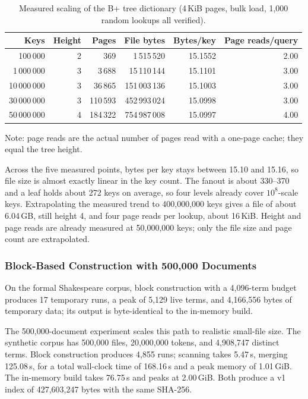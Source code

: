 \begin{table}[!htbp]
  \centering
  \caption{Measured scaling of the B+ tree dictionary (4\,KiB pages, bulk
  load, 1,000 random lookups all verified).}
  \label{tab:bptree-scale}
  \small
  \begin{tabular}{r r r r r r}
    \toprule
    Keys & Height & Pages & File bytes & Bytes/key & Page reads/query \\
    \midrule
    100\,000     & 2 & 369     & 1\,515\,520   & 15.1552 & 2.00 \\
    1\,000\,000   & 3 & 3\,688   & 15\,110\,144  & 15.1101 & 3.00 \\
    10\,000\,000  & 3 & 36\,865  & 151\,003\,136 & 15.1003 & 3.00 \\
    30\,000\,000  & 3 & 110\,593 & 452\,993\,024 & 15.0998 & 3.00 \\
    50\,000\,000  & 4 & 184\,322 & 754\,987\,008 & 15.0997 & 4.00 \\
    \bottomrule
  \end{tabular}
  \par\smallskip
  \footnotesize Note: page reads are the actual number of pages read with a
  one-page cache; they equal the tree height.
\end{table}



Across the five measured points, bytes per key stays between 15.10 and 15.16,
so file size is almost exactly linear in the key count. The fanout is about
330--370 and a leaf holds about 272 keys on average, so four levels already
cover $10^8$-scale keys. Extrapolating the measured trend to 400,000,000 keys
gives a file of about 6.04\,GB, still height 4, and four page reads per lookup,
about 16\,KiB. Height and page reads are already measured at 50,000,000 keys;
only the file size and page count are extrapolated.

\subsubsection{Block-Based Construction with 500,000 Documents}
\label{sec:block-results}

On the formal Shakespeare corpus, block construction with a 4,096-term budget
produces 17 temporary runs, a peak of 5,129 live terms, and 4,166,556 bytes of
temporary data; its output is byte-identical to the in-memory build.

The 500,000-document experiment scales this path to realistic small-file size.
The synthetic corpus has 500,000 files, 20,000,000 tokens, and 4,908,747
distinct terms. Block construction produces 4,855 runs; scanning takes 5.47\,s,
merging 125.08\,s, for a total wall-clock time of 168.16\,s and a peak memory
of 1.01\,GiB. The in-memory build takes 76.75\,s and peaks at 2.00\,GiB. Both
produce a v1 index of 427,603,247 bytes with the same SHA-256.

